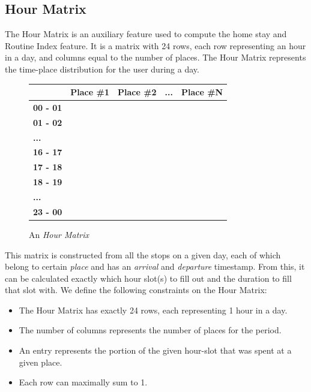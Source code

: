 \subsection{Hour Matrix}
\label{sub:hour-matrix}
The Hour Matrix is an auxiliary feature used to compute the home stay and Routine Index feature. It is a matrix with 24 rows, each row representing an hour in a day, and columns equal to the number of places. The Hour Matrix represents the time-place distribution for the user during a day.
\begin{figure}
    \centering
    \begin{tabular}{|l|l|l|l|l|}
    \hline
    \textbf{}        & \textbf{Place \#1} & \textbf{Place \#2} & \textbf{...} & \textbf{Place \#N} \\ \hline
    \textbf{00 - 01} &                    &                    &              &                    \\ \hline
    \textbf{01 - 02} &                    &                    &              &                    \\ \hline
    \textbf{...}     &                    &                    &              &                    \\ \hline
    \textbf{16 - 17} &                    &                    &              &                    \\ \hline
    \textbf{17 - 18} &                    &                    &              &                    \\ \hline
    \textbf{18 - 19} &                    &                    &              &                    \\ \hline
    \textbf{...}     &                    &                    &              &                    \\ \hline
    \textbf{23 - 00} &                    &                    &              &                    \\ \hline
    \end{tabular}
    \caption{An \textit{Hour Matrix}}
    \label{fig:time-table}
\end{figure}

This matrix is constructed from all the stops on a given day, each of which belong to certain \textit{place} and has an \textit{arrival} and \textit{departure} timestamp. From this, it can be calculated exactly which hour slot(s) to fill out and the duration to fill that slot with. We define the following constraints on the Hour Matrix:

\begin{itemize}
    \item The Hour Matrix has exactly 24 rows, each representing 1 hour in a day.
    \item The number of columns represents the number of places for the period. 
    \item An entry represents the portion of the given hour-slot that was spent at a given place.
    \item Each row can maximally sum to 1.
\end{itemize}

